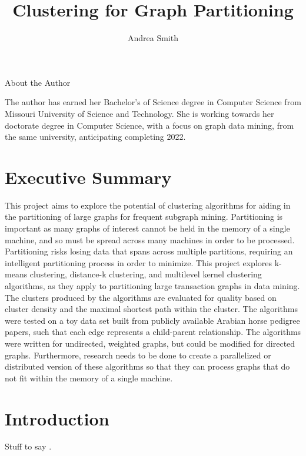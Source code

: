 \documentclass[12pt]{article}
\title{Clustering for Graph Partitioning}
\author{Andrea Smith}
\begin{document}
\begin{titlingpage}
\setlength{\droptitle}{30pt}
\maketitle
\begin{center}
{\selectfont
\large\centerline{About the Author}
}
The author has earned her Bachelor's of Science degree in Computer Science from Missouri University of Science and Technology. She is working towards her doctorate degree in Computer Science, with a focus on graph data mining, from the same university, anticipating completing 2022.
\end{center}
\end{titlingpage}

\tableofcontents

\newpage
\section{Executive Summary}
This project aims to explore the potential of clustering algorithms for aiding in the partitioning of large graphs for frequent subgraph mining. Partitioning is important as many graphs of interest cannot be held in the memory of a single machine, and so must be spread across many machines in order to be processed. Partitioning risks losing data that spans across multiple partitions, requiring an intelligent partitioning process in order to minimize. 
\newline\newline
This project explores k-means clustering, distance-k clustering, and multilevel kernel clustering algorithms, as they apply to partitioning large transaction graphs in data mining. The clusters produced by the algorithms are evaluated for quality based on cluster density and the maximal shortest path within the cluster. The algorithms were tested on a toy data set built from publicly available Arabian horse pedigree papers, such that each edge represents a child-parent relationship. The algorithms were written for undirected, weighted graphs, but could be modified for directed graphs. Furthermore, research needs to be done to create a parallelized or distributed version of these algorithms so that they can process graphs that do not fit within the memory of a single machine.

\newpage
\section{Introduction}
Stuff to say \cite{kernel,distK}.
\end{document}
